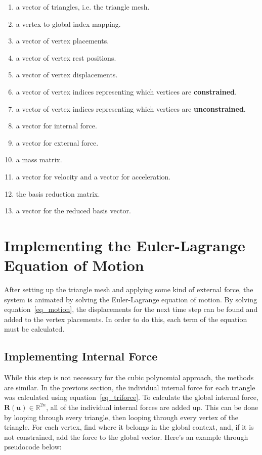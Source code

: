 \documentclass[twocolumn,10pt]{asme2ej}
\begin{document}
\begin{enumerate}
  \item a vector of triangles, i.e. the triangle mesh.
  \item a vertex to global index mapping.
  \item a vector of vertex placements.
  \item a vector of vertex rest positions.
  \item a vector of vertex displacements.
  \item a vector of vertex indices representing which vertices are \textbf{constrained}.
  \item a vector of vertex indices representing which vertices are \textbf{unconstrained}.
  \item a vector for internal force.
  \item a vector for external force.
  \item a mass matrix.
  \item a vector for velocity and a vector for acceleration.
  \item the basis reduction matrix.
  \item a vector for the reduced basis vector.
\end{enumerate}

\section{Implementing the Euler-Lagrange Equation of Motion}

After setting up the triangle mesh and applying some kind of external force, the system is animated by solving the Euler-Lagrange equation of motion. By solving equation~\ref{eq_motion}, the displacements for the next time step can be found and added to the vertex placements. In order to do this, each term of the equation must be calculated.

\subsection{Implementing Internal Force}

While this step is not necessary for the cubic polynomial approach, the methods are similar. In the previous section, the individual internal force for each triangle was calculated using equation~\ref{eq_triforce}. To calculate the global internal force, $\bm{R}(\bm{u}) \in \mathbb{R}^{2n}$, all of the individual internal forces are added up. This can be done by looping through every triangle, then looping through every vertex of the triangle. For each vertex, find where it belongs in the global context, and, if it is not constrained, add the force to the global vector. Here's an example through pseudocode below:
\end{document}

